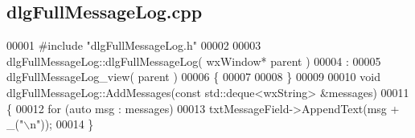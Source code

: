 \subsection{dlg\+Full\+Message\+Log.\+cpp}
\label{dlgFullMessageLog_8cpp_source}

\begin{DoxyCode}
00001 \textcolor{preprocessor}{#include "dlgFullMessageLog.h"}
00002 
00003 dlgFullMessageLog::dlgFullMessageLog( wxWindow* parent )
00004 :
00005 dlgFullMessageLog_view( parent )
00006 \{
00007 
00008 \}
00009 
00010 \textcolor{keywordtype}{void} dlgFullMessageLog::AddMessages(\textcolor{keyword}{const} std::deque<wxString> &messages)
00011 \{
00012     \textcolor{keywordflow}{for} (\textcolor{keyword}{auto} msg : messages)
00013         txtMessageField->AppendText(msg + \_(\textcolor{stringliteral}{"\(\backslash\)n"}));
00014 \}
\end{DoxyCode}
